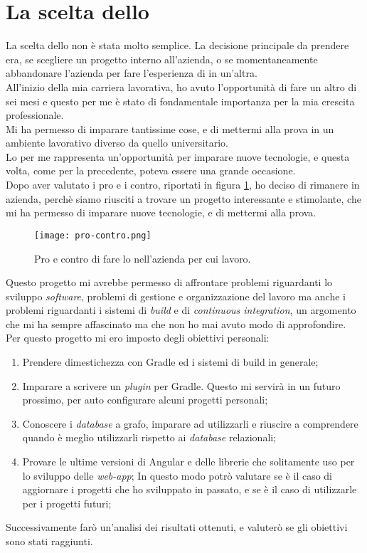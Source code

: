 \section{La scelta dello \stage{}}
La scelta dello \stage{} non è stata molto semplice. La decisione principale da prendere era, se scegliere un progetto interno all'azienda, o 
se momentaneamente abbandonare l'azienda per fare l'esperienza di \stage{} in un'altra.\\ 
All'inizio della mia carriera lavorativa, ho avuto l'opportunità di fare un altro \stage{} di sei mesi e questo per me è stato di fondamentale
importanza per la mia crescita professionale.\\ Mi ha permesso di imparare tantissime cose, e di mettermi alla prova in un ambiente lavorativo
diverso da quello universitario.\\ 
Lo \stage{} per me rappresenta un'opportunità per imparare nuove tecnologie, e questa volta, come per la precedente, 
poteva essere una grande occasione. \\
Dopo aver valutato i pro e i contro, riportati in figura \ref*{fig:pro-contro}, ho deciso di rimanere in azienda, perchè siamo riusciti
a trovare un progetto interessante e stimolante, che mi ha permesso di imparare nuove tecnologie, e di mettermi alla prova.\\
\begin{figure}[!h] 
  \centering 
  \texttt{[image: pro-contro.png]}
  \caption{Pro e contro di fare lo \stage{} nell'azienda per cui lavoro.}
  \label{fig:pro-contro}
\end{figure}

Questo progetto mi avrebbe permesso di affrontare problemi riguardanti lo sviluppo \textit{software}, problemi di gestione e organizzazione del lavoro ma 
anche i problemi riguardanti i sistemi di \textit{build} e di \textit{continuous integration}, un argomento che mi ha sempre affascinato ma che non ho mai
avuto modo di approfondire.\\
Per questo progetto mi ero imposto degli obiettivi personali:
\begin{enumerate}
  \label{obiettivi-personali}
  \item Prendere dimestichezza con Gradle ed i sistemi di build in generale;
  \item Imparare a scrivere un \textit{plugin} per Gradle. Questo mi servirà in un futuro prossimo, per auto configurare alcuni progetti personali;
  \item Conoscere i \textit{database} a grafo, imparare ad utilizzarli e riuscire a comprendere quando è meglio utilizzarli rispetto ai \textit{database} relazionali;
  \item Provare le ultime versioni di Angular e delle librerie che solitamente uso per lo sviluppo delle \textit{web-app}; 
      In questo modo potrò valutare se è il caso di aggiornare i progetti che ho sviluppato in passato, e se è il caso di utilizzarle per i progetti futuri;
\end{enumerate}
Successivamente farò un'analisi dei risultati ottenuti, e valuterò se gli obiettivi sono stati raggiunti.\\
